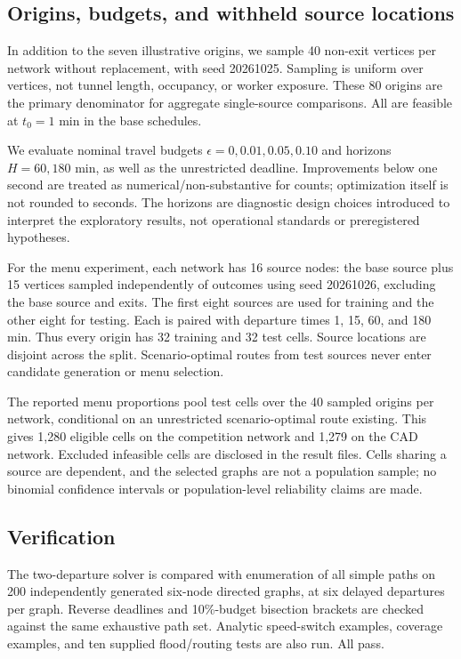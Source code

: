 \documentclass[11pt]{article}
\begin{document}
\subsection{Origins, budgets, and withheld source locations}
In addition to the seven illustrative origins, we sample 40 non-exit vertices per network without replacement, with seed 20261025. Sampling is uniform over vertices, not tunnel length, occupancy, or worker exposure. These 80 origins are the primary denominator for aggregate single-source comparisons. All are feasible at $t_0=1$ min in the base schedules.

We evaluate nominal travel budgets $\epsilon=0,0.01,0.05,0.10$ and horizons $H=60,180$ min, as well as the unrestricted deadline. Improvements below one second are treated as numerical/non-substantive for counts; optimization itself is not rounded to seconds. The horizons are diagnostic design choices introduced to interpret the exploratory results, not operational standards or preregistered hypotheses.

For the menu experiment, each network has 16 source nodes: the base source plus 15 vertices sampled independently of outcomes using seed 20261026, excluding the base source and exits. The first eight sources are used for training and the other eight for testing. Each is paired with departure times 1, 15, 60, and 180 min. Thus every origin has 32 training and 32 test cells. Source locations are disjoint across the split. Scenario-optimal routes from test sources never enter candidate generation or menu selection.

The reported menu proportions pool test cells over the 40 sampled origins per network, conditional on an unrestricted scenario-optimal route existing. This gives 1,280 eligible cells on the competition network and 1,279 on the CAD network. Excluded infeasible cells are disclosed in the result files. Cells sharing a source are dependent, and the selected graphs are not a population sample; no binomial confidence intervals or population-level reliability claims are made.

\subsection{Verification}
The two-departure solver is compared with enumeration of all simple paths on 200 independently generated six-node directed graphs, at six delayed departures per graph. Reverse deadlines and 10\%-budget bisection brackets are checked against the same exhaustive path set. Analytic speed-switch examples, coverage examples, and ten supplied flood/routing tests are also run. All pass.
\end{document}

